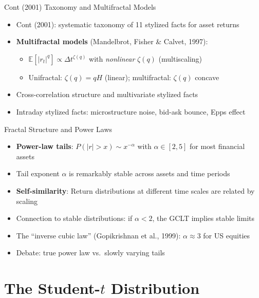 \documentclass[9pt, aspectratio=169, t]{beamer}
\theoremstyle{definition}
\newcommand{\E}{\mathbb{E}}
\begin{document}
\begin{frame}{Cont (2001) Taxonomy and Multifractal Models}
\begin{itemize}
\item Cont (2001): systematic taxonomy of 11 stylized facts for asset returns
\item \textbf{Multifractal models} (Mandelbrot, Fisher \& Calvet, 1997):
\begin{itemize}
\item $\E[|r_t|^q] \propto \Delta t^{\zeta(q)}$ with \textit{nonlinear} $\zeta(q)$ (multiscaling)
\item Unifractal: $\zeta(q) = qH$ (linear); multifractal: $\zeta(q)$ concave
\end{itemize}
\item Cross-correlation structure and multivariate stylized facts
\item Intraday stylized facts: microstructure noise, bid-ask bounce, Epps effect
\end{itemize}
\end{frame}

\begin{frame}{Fractal Structure and Power Laws}
\begin{itemize}
\item \textbf{Power-law tails}: $P(|r| > x) \sim x^{-\alpha}$ with $\alpha \in [2, 5]$ for most financial assets
\item Tail exponent $\alpha$ is remarkably stable across assets and time periods
\item \textbf{Self-similarity}: Return distributions at different time scales are related by scaling
\item Connection to stable distributions: if $\alpha < 2$, the GCLT implies stable limits
\item The ``inverse cubic law'' (Gopikrishnan et al., 1999): $\alpha \approx 3$ for US equities
\item Debate: true power law vs.\ slowly varying tails
\end{itemize}
\end{frame}

\section{The Student-$t$ Distribution}
\end{document}
